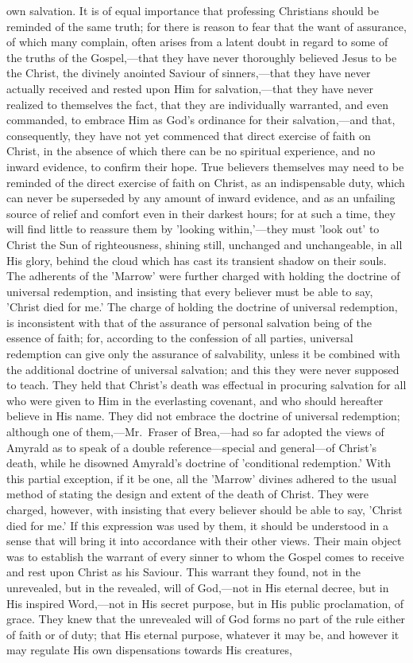 \documentclass[
]{book}
\begin{document}
own salvation. It is of equal importance that professing Christians should be reminded of the same truth; for there is reason to fear that the want of assurance, of which many complain, often arises from a latent doubt in regard to some of the truths of the Gospel,---that they have never thoroughly believed Jesus to be the Christ, the divinely anointed Saviour of sinners,---that they have never actually received and rested upon Him for salvation,---that they have never realized to themselves the fact, that they are individually warranted, and even commanded, to embrace Him as God's ordinance for their salvation,---and that, consequently, they have not yet commenced that direct exercise of faith on Christ, in the absence of which there can be no spiritual experience, and no inward evidence, to confirm their hope. True believers themselves may need to be reminded of the direct exercise of faith on Christ, as an indispensable duty, which can never be superseded by any amount of inward evidence, and as an unfailing source of relief and comfort even in their darkest hours; for at such a time, they will find little to reassure them by 'looking within,'---they must 'look out' to Christ the Sun of righteousness, shining still, unchanged and unchangeable, in all His glory, behind the cloud which has cast its transient shadow on their souls. The adherents of the 'Marrow' were further charged with holding the doctrine of universal redemption, and insisting that every believer must be able to say, 'Christ died for me.' The charge of holding the doctrine of universal redemption, is inconsistent with that of the assurance of personal salvation being of the essence of faith; for, according to the confession of all parties, universal redemption can give only the assurance of salvability, unless it be combined with the additional doctrine of universal salvation; and this they were never supposed to teach. They held that Christ's death was effectual in procuring salvation for all who were given to Him in the everlasting covenant, and who should hereafter believe in His name. They did not embrace the doctrine of universal redemption; although one of them,---Mr.~Fraser of Brea,---had so far adopted the views of Amyrald as to speak of a double reference---special and general---of Christ's death, while he disowned Amyrald's doctrine of 'conditional redemption.' With this partial exception, if it be one, all the 'Marrow' divines adhered to the usual method of stating the design and extent of the death of Christ. They were charged, however, with insisting that every believer should be able to say, 'Christ died for me.' If this expression was used by them, it should be understood in a sense that will bring it into accordance with their other views. Their main object was to establish the warrant of every sinner to whom the Gospel comes to receive and rest upon Christ as his Saviour. This warrant they found, not in the unrevealed, but in the revealed, will of God,---not in His eternal decree, but in His inspired Word,---not in His secret purpose, but in His public proclamation, of grace. They knew that the unrevealed will of God forms no part of the rule either of faith or of duty; that His eternal purpose, whatever it may be, and however it may regulate His own dispensations towards His creatures, 
\end{document}
